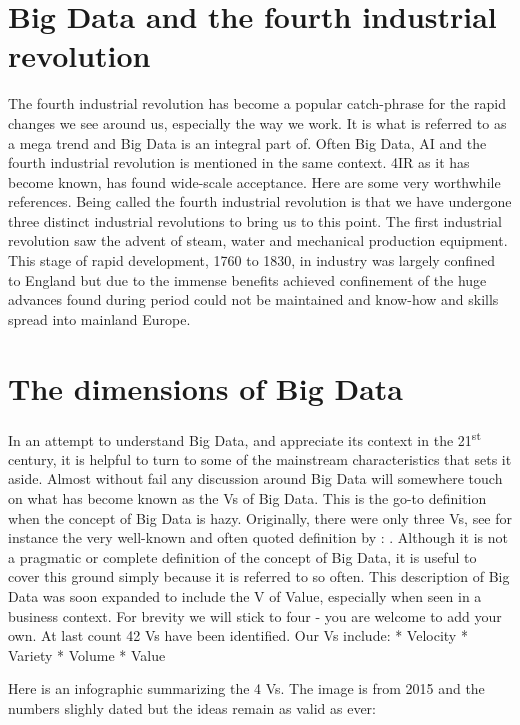 \section{Big Data and the fourth industrial revolution}
The fourth industrial revolution has become a popular catch-phrase for the rapid changes we see around us, especially the way we work.  It is what is referred to as a mega trend and Big Data is an integral part of.  Often Big Data, AI and the fourth industrial revolution is mentioned in the same context.  4IR as it has become known, has found wide-scale acceptance.   Here are some very worthwhile references.  
Being called the fourth industrial revolution is that we have undergone three distinct industrial revolutions to bring us to this point. 
The first industrial revolution saw the advent of steam, water and mechanical production equipment.  This stage of rapid development, 1760 to 1830, in industry was largely confined to England but due to the immense benefits achieved confinement of the huge advances found during period could not be maintained and know-how and skills spread into mainland Europe.

\section{The dimensions of Big Data}
In an attempt to understand Big Data, and appreciate its context in the 21\textsuperscript{st} century, it is helpful to turn to some of the mainstream characteristics that sets it aside.  Almost without fail any discussion around Big Data will somewhere touch on what has become known as the V\textquotesingle s of Big Data.  This is the go-to definition when the concept of Big Data is hazy.  Originally, there were only three V\textquotesingle s, see for instance the very well-known and often quoted definition by \cite{Gar}: . 
Although it is not a pragmatic or complete definition of the concept of Big Data, it is useful to cover this ground simply because it is referred to so often.
This description of Big Data was soon expanded to include the V of Value, especially when seen in a business context.  
For brevity we will stick to four - you are welcome to add your own.  At last count 42 V\textquotesingle s have been identified.  Our V\textquotesingle s include:
* Velocity
* Variety
* Volume
* Value

Here is an infographic summarizing the 4 Vs.  The image is from 2015 and the numbers slighly dated but the ideas remain as valid as ever:

